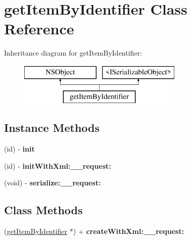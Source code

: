 \hypertarget{interfaceget_item_by_identifier}{}\section{get\+Item\+By\+Identifier Class Reference}
\label{interfaceget_item_by_identifier}
Inheritance diagram for get\+Item\+By\+Identifier\+:\begin{figure}[H]
\begin{center}
\leavevmode
\includegraphics[height=2.000000cm]{interfaceget_item_by_identifier}
\end{center}
\end{figure}
\subsection*{Instance Methods}
\begin{DoxyCompactItemize}
\item 
\hypertarget{interfaceget_item_by_identifier_a95d84a53cc6eb462c3356992643e24fc}{}(id) -\/ {\bfseries init}\label{interfaceget_item_by_identifier_a95d84a53cc6eb462c3356992643e24fc}

\item 
\hypertarget{interfaceget_item_by_identifier_a62b5cc55da25ffe8976331a9a112f000}{}(id) -\/ {\bfseries init\+With\+Xml\+:\+\_\+\+\_\+request\+:}\label{interfaceget_item_by_identifier_a62b5cc55da25ffe8976331a9a112f000}

\item 
\hypertarget{interfaceget_item_by_identifier_aecdc7bf4e860d0da2a1c07172d7bf929}{}(void) -\/ {\bfseries serialize\+:\+\_\+\+\_\+request\+:}\label{interfaceget_item_by_identifier_aecdc7bf4e860d0da2a1c07172d7bf929}

\end{DoxyCompactItemize}
\subsection*{Class Methods}
\begin{DoxyCompactItemize}
\item 
\hypertarget{interfaceget_item_by_identifier_a34c1561a76f6c770c46f89fcdd66764e}{}(\hyperlink{interfaceget_item_by_identifier}{get\+Item\+By\+Identifier} $\ast$) + {\bfseries create\+With\+Xml\+:\+\_\+\+\_\+request\+:}\label{interfaceget_item_by_identifier_a34c1561a76f6c770c46f89fcdd66764e}

\end{DoxyCompactItemize}
